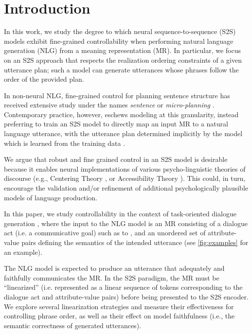 \section{Introduction}

In this work, we study the degree to which neural sequence-to-sequence (S2S)
models exhibit fine-grained controllability when performing natural language
generation (NLG) from a meaning representation (MR).  In particular, we focus
on an  S2S approach that respects the realization ordering constraints of a
given utterance plan; such a model can generate utterances whose phrases
follow the order of the provided plan.

In non-neural NLG, fine-grained control for planning sentence structure has
received extensive study under the names \textit{sentence} or
\textit{micro-planning} \cite{reiter2000,walker2001,stone2003}.  Contemporary
practice, however, eschews modeling at this granularity, instead preferring to
train an S2S model to directly map an input MR to a natural language
utterance, with the utterance plan determined implicitly by the model
which is learned from the training data \cite{dusek2020}.

We argue that robust and fine grained control in an S2S model is desirable
because it enables neural implementations of various psycho-linguistic
theories of discourse (e.g., Centering Theory \cite{grosz1995}, or
Accessibility Theory \cite{ariel2001}).  This could, in turn, encourage the
validation and/or refinement of additional psychologically plausible models of
language production.
 


In this paper, we study controllability in the context of task-oriented
dialogue generation \cite{mairesse2010,wen2015}, where the input to the NLG
model is an MR consisting of a dialogue act (i.e. a communicative goal) such as
to , and an unordered set of attribute-value pairs
defining the semantics of the intended utterance (see \autoref{fig:examples}
for an example). 


The NLG model is expected to produce an utterance that adequately and
faithfully communicates the MR.  In the S2S paradigm, the MR must be
``linearized'' (i.e.  represented as a linear sequence of tokens corresponding
to the dialogue act and attribute-value pairs) before being presented to the S2S
 encoder.  We explore several linearization strategies and measure
their effectiveness for controlling phrase order, as well as their effect on
 model faithfulness (i.e., the semantic correctness of generated utterances).

